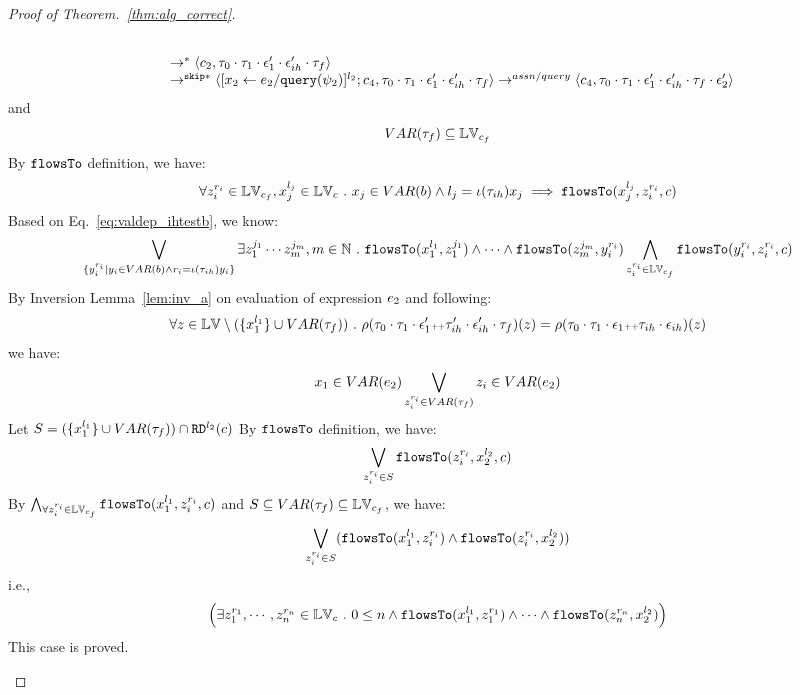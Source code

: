 \begin{proof}[Proof of Theorem.~\ref{thm:alg_correct}]
\begin{case}
\begin{subcase}
\begin{subsubcase}
\begin{subsubsubcase}
\begin{subproof}
\begin{enumerate}
\begin{enumerate}
\[\begin{array}{l}
  \\
  \qquad \rightarrow^{*} 
  \langle c_2, 
  \mathtt{\tau}_0 \cdot \mathtt{\tau}_1 \cdot \mathtt{\epsilon}_1' \cdot \mathtt{\epsilon}_{ih}' \cdot \mathtt{\tau}_f \rangle
  \\
  \qquad \rightarrow^{\mathtt{skip}*} 
  \langle [\mathrel{ {x}_2 \leftarrow e_2 / {\tt query}(\psi_2) }]^{l_2};{c}_4, 
  \mathtt{\tau}_0 \cdot \mathtt{\tau}_1 \cdot \mathtt{\epsilon}_1' \cdot \mathtt{\epsilon}_{ih}' \cdot \mathtt{\tau}_f \rangle
  \rightarrow^{assn/query} 
  \langle {c}_4,  \mathtt{\tau}_0 \cdot \mathtt{\tau}_1 \cdot \mathtt{\epsilon}_1' \cdot \mathtt{\epsilon}_{ih}' \cdot \mathtt{\tau}_f \cdot \mathtt{\epsilon}_2' \rangle 
\end{array}
\]
and 
\[
  VAR{(\mathtt{\tau}_f)} \subseteq \mathbb{LV}_{c_f}
\]
%
By $\mathtt{flowsTo}$ definition, we have:
\[
  \forall z_i^{r_i} \in \mathbb{LV}_{c_f},  x_j^{l_j} \in \mathbb{LV}_c ~.~ x_j \in VAR(b) \land l_j = \iota(\mathtt{\tau}_{ih}) x_j \implies
  \mathtt{flowsTo}(x_j^{l_j}, z_i^{r_i}, c)
\]
%
Based on Eq.~\ref{eq:valdep_ihtestb}, we know:
%
\[
  \bigvee_{\{y_i^{r_i} \vert y_i \in VAR(b) \land r_i = \iota(\mathtt{\tau}_{ih}) y_i\}}
  \exists z_1^{j_1} \cdots z_m^{j_m}, m \in \mathbb{N} ~.~ 
  \mathtt{flowsTo}(x_1^{l_1}, z_1^{j_1}) \land \cdots \land  \mathtt{flowsTo}(z_m^{j_m}, y_i^{r_i})
  \bigwedge_{z_i^{r_i} \in \mathbb{LV}_{c_f}}
    \mathtt{flowsTo}(y_i^{r_i}, z_i^{r_i}, c) 
\]
%
By Inversion Lemma~\ref{lem:inv_a} on evaluation of expression $e_2$ and following: 
\[
  \forall z \in \mathbb{LV} \setminus (\{x_1^{l_1}\} \cup VAR{(\mathtt{\tau}_f)}) ~.~
  \rho(\mathtt{\tau}_0 \cdot \mathtt{\tau}_1 \cdot \mathtt{\epsilon}_1' {\scriptscriptstyle ++} \mathtt{\tau}_{ih}' \cdot \mathtt{\epsilon}_{ih}' \cdot \mathtt{\tau}_f)(z) 
  = \rho(\mathtt{\tau}_0 \cdot \mathtt{\tau}_1 \cdot \mathtt{\epsilon}_1 {\scriptscriptstyle ++} \mathtt{\tau}_{ih} \cdot \mathtt{\epsilon}_{ih})(z)
\]
%
we have:
\[
  x_1 \in VAR(e_2) \bigvee_{z_i^{r_i} \in VAR{(\mathtt{\tau}_f)}} z_i \in VAR(e_2)
\]
%
Let $S = (\{x_1^{l_1}\} \cup VAR{(\mathtt{\tau}_f)}) \cap \mathtt{RD}^{l_2}(c) $
%
By $\mathtt{flowsTo}$ definition, we have:
\[
   \bigvee_{z_i^{r_i} \in S}  \mathtt{flowsTo}(z_i^{r_i}, x_2^{l_2}, c)
\]
By $ \bigwedge_{\forall z_i^{r_i} \in \mathbb{LV}_{c_f}} \mathtt{flowsTo}(x_1^{l_1}, z_i^{r_i}, c)$ and $S \subseteq VAR{(\mathtt{\tau}_f)} \subseteq \mathbb{LV}_{c_f}$, we have:
\[
\bigvee_{z_i^{r_i} \in S} 
(\mathtt{flowsTo}(x_1^{l_1}, z_i^{r_i}) \land \mathtt{flowsTo}(z_i^{r_i}, x_2^{l_2}))
\]
%
i.e.,
\[
\Big(\exists z_1^{r_1}, \cdots, z_n^{r_n} \in \mathbb{LV}_{{c}} ~.~ 0 \leq n 
 \land \mathtt{flowsTo}(x_1^{l_1}, z_1^{r_1}) \land \cdots \land \mathtt{flowsTo}(z_n^{r_n}, {x}_2^{l_2}) \Big)
\]
%
This case is proved.
\end{enumerate}

\end{enumerate}
\end{subproof}
\end{subsubsubcase}
\end{subsubcase}
\end{subcase}
\end{case}
\end{proof}
